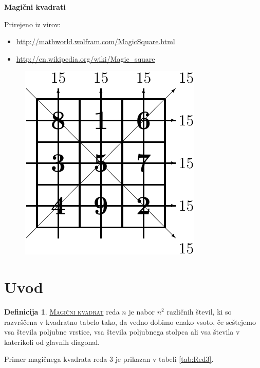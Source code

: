 \documentclass[a4paper,12pt]{article}
\newcommand{\pojem}[1]{\underline{\textsc{#1}}}
\theoremstyle{definition}
\newtheorem{definicija}{Definicija}
\theoremstyle{plain}
\begin{document}
\setlength{\belowcaptionskip}{2mm}
\setlength{\parindent}{0mm}

\begin{center}
   \LARGE{\textbf{Magični kvadrati}}
\end{center}
Prirejeno iz virov:
\begin{itemize}
   \item \url{http://mathworld.wolfram.com/MagicSquare.html}
   \item \url{http://en.wikipedia.org/wiki/Magic_square}
\end{itemize}

\begin{figure}[ht]
   \centering
   \includegraphics{slika.pdf}
\end{figure}

\tableofcontents

\pagebreak
\section{Uvod}
\begin{definicija}
   \pojem{Magični kvadrat} reda $n$ je nabor $n^2$ različnih števil,
   ki so razvrščena v kvadratno tabelo tako, da vedno dobimo enako vsoto,
   če seštejemo vsa števila poljubne vrstice, vsa števila poljubnega
   stolpca ali vsa števila v katerikoli od glavnih diagonal.
\end{definicija}

Primer magičnega kvadrata reda 3 je prikazan v tabeli \ref{tab:Red3}.
\end{document}
